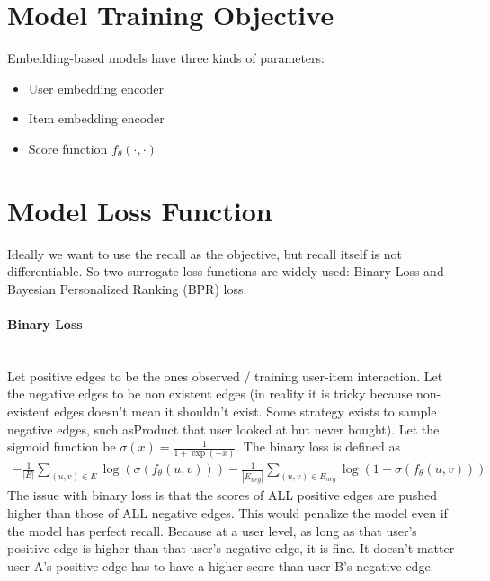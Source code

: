 \section{Model Training Objective} 
Embedding-based models have three kinds of parameters: 
    \begin{itemize}
        \item User embedding encoder
        \item Item embedding encoder
        \item Score function $f_\theta(\cdot, \cdot)$
    \end{itemize}
    
\section{Model Loss Function}
Ideally we want to use the recall as the objective, but recall itself is not differentiable. So two surrogate loss functions are widely-used: Binary Loss and Bayesian Personalized Ranking (BPR) loss.  

\paragraph{Binary Loss} \mbox{}\\
Let positive edges to be the ones observed / training user-item interaction. Let the negative edges to be non existent edges (in reality it is tricky because non-existent edges doesn't mean it shouldn't exist. Some strategy exists to sample negative edges, such asProduct that user looked at but never bought). Let the sigmoid function be $\sigma(x) = \frac{1}{1 + \exp(-x)}$. The binary loss is defined as 
    \begin{align*}
        - \frac{1}{|E|} \sum_{(u,v)\in E} \log (\sigma(f_\theta(u,v))) - \frac{1}{|E_{neg}|} \sum_{(u,v)\in E_{neg}} \log (1 - \sigma(f_\theta(u,v)))
    \end{align*}
The issue with binary loss is that the scores of ALL positive edges are pushed higher than those of ALL negative edges. This would penalize the model even if the model has perfect recall. Because at a user level, as long as that user's positive edge is higher than that user's negative edge, it is fine. It doesn't matter user A's positive edge has to have a higher score than user B's negative edge. 

